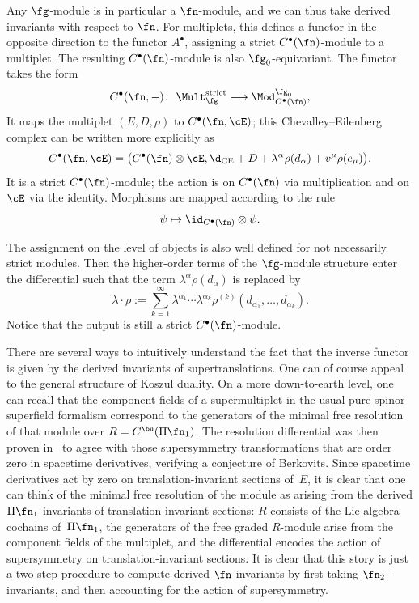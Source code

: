 Any $\fg$-module is in particular a $\fn$-module, and we can thus take derived invariants with respect to $\fn$. For multiplets, this defines a functor in the opposite direction to the functor $A^\bullet$, assigning a strict $C^\bullet(\fn)$-module to a multiplet. The resulting $C^\bullet(\fn)$-module is also $\fg_0$-equivariant.
The functor takes the form
\begin{equation*}
C^\bullet(\fn , -) \colon \ \Mult_{\fg}^{\mathrm{strict}} \longrightarrow \Mod^{\fg_0}_{C^\bullet(\fn)},
\end{equation*}
It maps the multiplet	$(E,D,\rho)$ to $C^\bullet(\fn , \cE)$; this Chevalley--Eilenberg complex can be written more explicitly as
\begin{equation*}
C^\bullet(\fn , \cE) = \big( C^\bullet(\fn) \otimes \cE , \d_{\mathrm{CE}} + D + \lambda^\alpha \rho(d_\alpha) + v^\mu \rho(e_\mu) \big) .
\end{equation*}
It is a strict $C^\bullet(\fn)$-module; the action is on $C^\bullet(\fn)$ via multiplication and on $\cE$ via the identity. Morphisms are mapped according to the rule
\begin{equation*}
\psi \mapsto
\id_{C^\bullet(\fn)} \otimes \psi .
\end{equation*}

\begin{rmk}
	The assignment on the level of objects is also well defined for not necessarily strict modules. Then the higher-order terms of the $\fg$-module structure enter the differential such that the term $\lambda^\alpha \rho(d_\alpha)$ is replaced by
	\begin{equation*}
	\lambda \cdot \rho := \sum_{k=1}^{\infty} \lambda^{\alpha_1} \cdots \lambda^{\alpha_k} \rho^{(k)}(d_{\alpha_1} , \dots , d_{\alpha_k}).
	\end{equation*}
	Notice that the output is still a strict $C^\bullet(\fn)$-module.
\end{rmk}
There are several ways to intuitively understand the fact that the inverse functor is given by the derived invariants of supertranslations. One can of course appeal to the general structure of Koszul duality. On a more down-to-earth level, one can recall that the component fields of a supermultiplet in the usual pure spinor superfield formalism correspond to the generators of the minimal free resolution of that module over $R = C^\bu(\Pi \fn_1)$. The resolution differential was then proven in~\cite{perspectives} to agree with those supersymmetry transformations that are order zero in spacetime derivatives, verifying a conjecture of Berkovits. Since spacetime derivatives act by zero on translation-invariant sections of~$E$, it is clear that one can think of the minimal free resolution of the module as arising from the derived $\Pi \fn_1$-invariants of translation-invariant sections: $R$ consists of the Lie algebra cochains of~$\Pi \fn_1$, the generators of the free graded $R$-module arise from the component fields of the multiplet, and the differential encodes the action of supersymmetry on translation-invariant sections. It is clear that this story is just a two-step procedure to compute derived $\fn$-invariants by first taking $\fn_2$-invariants, and then accounting for the action of supersymmetry.

